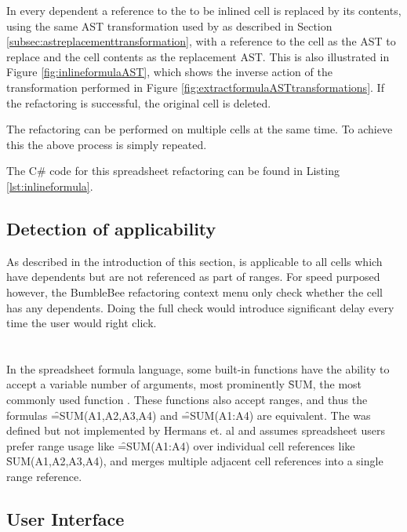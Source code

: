 In every dependent a reference to the to be inlined cell is replaced by its contents, using the same AST transformation used by  as described in Section \ref{subsec:astreplacementtransformation}, with a reference to the cell as the AST to replace and the cell contents as the replacement AST.
This is also illustrated in Figure \ref{fig:inlineformulaAST}, which shows the  inverse action of the transformation performed in Figure \ref{fig:extractformulaASTtransformations}.
If the refactoring is successful, the original cell is deleted.

The refactoring can be performed on multiple cells at the same time.
To achieve this the above process is simply repeated.

The C\# code for this spreadsheet refactoring can be found in Listing \ref{lst:inlineformula}.

\subsection{Detection of applicability}

As described in the introduction of this section,  is applicable to all cells which have dependents but are not referenced as part of ranges.
For speed purposed however, the BumbleBee refactoring context menu only check whether the cell has any dependents.
Doing the full check would introduce significant delay every time the user would right click.

\section{}

In the spreadsheet formula language, some built-in functions have the ability to accept a variable number of arguments, most prominently \f{SUM}, the most commonly used function \cite{hermans2014enron}.
These functions also accept ranges, and thus the formulas \f{=SUM(A1,A2,A3,A4)} and \f{=SUM(A1:A4)} are equivalent.
The  was defined but not implemented by Hermans et. al \cite{hermans2014detecting} and assumes spreadsheet users prefer range usage like \f{=SUM(A1:A4)} over individual cell references like \f{SUM(A1,A2,A3,A4)}, and merges multiple adjacent cell references into a single range reference.

\subsection{User Interface}

